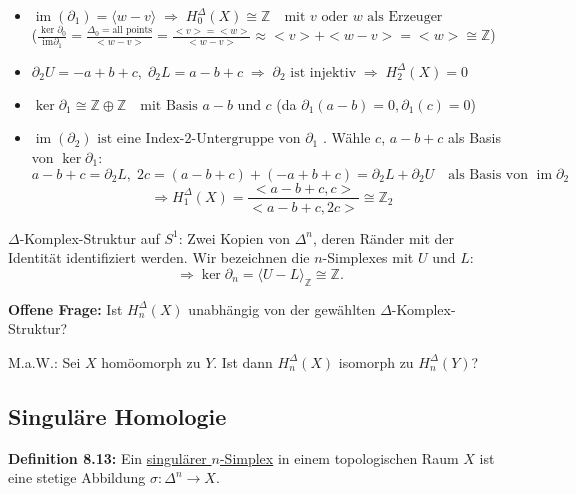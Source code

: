 \documentclass[fleqn, 12pt, letterpaper]{article}
\newcommand{\txt}[1]{\text{#1}}
\begin{document}
\begin{itemize}
  \item 
  \(
    \operatorname{im}(\partial_1) = \langle w - v \rangle 
    \; \Rightarrow \; H_0^\Delta(X) \cong \mathbb{Z}
    \quad \text{mit } v \text{ oder } w \text{ als Erzeuger}
  \)\\
  ($\frac{\ker \partial_0}{\txt{im}\partial_1}=\frac{\Delta_0=\txt{all points}}{<w-v>}=\frac{<v>=<w>}{<w-v>}\approx <v>+<w-v>=<w>\cong \mathbb{Z}$)

  \item \(
    \partial_2 U = -a + b + c,\; 
    \partial_2 L = a - b + c \;\Rightarrow \;\partial_2 \text{ ist injektiv} 
    \; \Rightarrow \; H_2^\Delta(X) = 0
  \)

\item 
  \(
    \ker \partial_1 \cong \mathbb{Z} \oplus \mathbb{Z}
    \quad \text{mit Basis } a - b \text{ und } c
  \) (da \(\partial_1(a-b)=0, \partial_1(c)=0\))
 
  \item 
  \(
    \operatorname{im}(\partial_2) \text{ ist eine Index-2-Untergruppe von } \partial_1
  \)
. Wähle $c$, $a - b + c$ als Basis von $\ker \partial_1$:
  \[
    a-b + c=\partial _2L, \; 2c = (a - b + c) + (-a + b + c) 
    = \partial_2 L + \partial_2 U \quad \text{als Basis von } \operatorname{im} \partial_2
  \]
\[
  \Rightarrow H_1^\Delta(X)=\frac{<a-b+c,c>}{<a-b+c,2c>} \cong \mathbb{Z}_2
\]
\end{itemize}

$\Delta$-Komplex-Struktur auf $S^1$: Zwei Kopien von $\Delta^n$, deren Ränder mit der Identität identifiziert werden. Wir bezeichnen die $n$-Simplexes mit $U$ und $L$:
  \[
    \Rightarrow \ker \partial_n = \langle U - L \rangle_{\mathbb{Z}} \cong \mathbb{Z}.
  \]

\vspace{1em}

\noindent\textbf{Offene Frage:} Ist $H_n^\Delta(X)$ unabhängig von der gewählten $\Delta$-Komplex-Struktur?

\medskip

\noindent
M.a.W.: Sei $X$ homöomorph zu $Y$. Ist dann $H_n^\Delta(X)$ isomorph zu $H_n^\Delta(Y)$?

\subsection{Singuläre Homologie}

\textbf{Definition 8.13:} Ein \underline{singulärer $n$-Simplex} in einem topologischen Raum $X$ ist eine stetige Abbildung $\sigma \colon \Delta^n \to X$.\\
\end{document}
